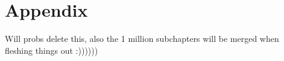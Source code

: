 \chapter{Appendix}
Will probs delete this, also the 1 million subchapters will be merged when fleshing things out :))))))
